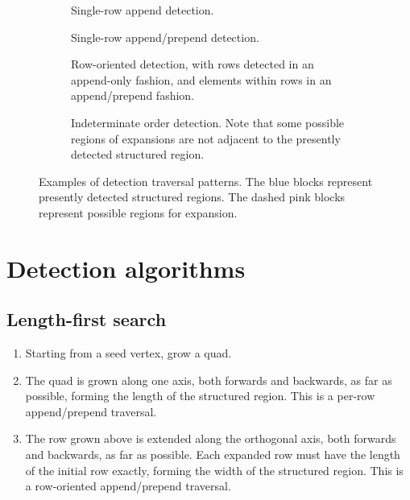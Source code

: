 \begin{figure}
\begin{subfigure}[t]{0.45\textwidth}
	\centering
	
	\caption{Single-row append detection.}
\end{subfigure}
\begin{subfigure}[t]{0.45\textwidth}
	\centering
	
	\caption{Single-row append/prepend detection.}
\end{subfigure}
\begin{subfigure}[b]{0.45\textwidth}
	\centering
	
	\vspace{4.5mm}
	\caption{Row-oriented detection, with rows detected in an append-only fashion, and elements within rows in an append/prepend fashion.}
\end{subfigure}
\begin{subfigure}[b]{0.45\textwidth}
	\centering
	
	\caption{Indeterminate order detection. Note that some possible regions of expansions are not adjacent to the presently detected structured region.}
\end{subfigure}

\caption{Examples of detection traversal patterns. The blue blocks represent presently detected structured regions. The dashed pink blocks represent possible regions for expansion.\label{fig:detection-traversal-patterns}}
\end{figure}



\section{Detection algorithms}

\subsection{Length-first search}

\begin{enumerate}
\item Starting from a seed vertex, grow a quad.

\item The quad is grown along one axis, both forwards and backwards, as far as possible, forming the length of the structured region. This is a per-row append/prepend traversal.
\item The row grown above is extended along the orthogonal axis, both forwards and backwards, as far as possible. Each expanded row must have the length of the initial row exactly, forming the width of the structured region. This is a row-oriented append/prepend traversal.
\end{enumerate}

